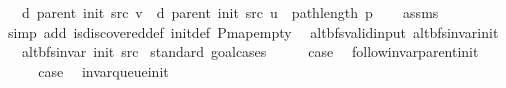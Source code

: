 \begin{isabellebody}
\ \ \ {\isachardoublequoteopen}d\ {\isacharparenleft}{\kern0pt}parent\ {\isacharparenleft}{\kern0pt}init\ src{\isacharparenright}{\kern0pt}{\isacharparenright}{\kern0pt}\ v\ {\isasymle}\ d\ {\isacharparenleft}{\kern0pt}parent\ {\isacharparenleft}{\kern0pt}init\ src{\isacharparenright}{\kern0pt}{\isacharparenright}{\kern0pt}\ u\ {\isacharplus}{\kern0pt}\ path{\isacharunderscore}{\kern0pt}length\ p{\isachardoublequoteclose}\isanewline
%
\isadelimproof
\ \ %
\endisadelimproof
%
\isatagproof
{}\isamarkupfalse%
\ assms\isanewline
\ \ \isamarkupfalse%
\ {\isacharparenleft}{\kern0pt}simp\ add{\isacharcolon}{\kern0pt}\ is{\isacharunderscore}{\kern0pt}discovered{\isacharunderscore}{\kern0pt}def\ init{\isacharunderscore}{\kern0pt}def\ P{\isachardot}{\kern0pt}map{\isacharunderscore}{\kern0pt}empty{\isacharparenright}{\kern0pt}%
\endisatagproof
{\isafoldproof}%
%
\isadelimproof
%
\endisadelimproof
%
\isadelimdocument
%
\endisadelimdocument
%
\isatagdocument
%
\isamarkupsubsubsection{%
}
\isamarkuptrue%
%
\endisatagdocument
{\isafolddocument}%
%
\isadelimdocument
%
\endisadelimdocument
{}\isamarkupfalse%
\ {\isacharparenleft}{\kern0pt}\ alt{\isacharunderscore}{\kern0pt}bfs{\isacharunderscore}{\kern0pt}valid{\isacharunderscore}{\kern0pt}input{\isacharparenright}{\kern0pt}\ alt{\isacharunderscore}{\kern0pt}bfs{\isacharunderscore}{\kern0pt}invar{\isacharunderscore}{\kern0pt}init{\isacharcolon}{\kern0pt}\isanewline
\ \ \ {\isachardoublequoteopen}alt{\isacharunderscore}{\kern0pt}bfs{\isacharunderscore}{\kern0pt}invar{\isacharprime}{\kern0pt}{\isacharprime}{\kern0pt}\ {\isacharparenleft}{\kern0pt}init\ src{\isacharparenright}{\kern0pt}{\isachardoublequoteclose}\isanewline
%
\isadelimproof
%
\endisadelimproof
%
\isatagproof
{}\isamarkupfalse%
\ {\isacharparenleft}{\kern0pt}standard{\isacharcomma}{\kern0pt}\ goal{\isacharunderscore}{\kern0pt}cases{\isacharparenright}{\kern0pt}\isanewline
{}\isamarkupfalse%
\ {}\isanewline
\ \ \isamarkupfalse%
\ {\isacharquery}{\kern0pt}case\ \isamarkupfalse%
\ follow{\isacharunderscore}{\kern0pt}invar{\isacharunderscore}{\kern0pt}parent{\isacharunderscore}{\kern0pt}init\ \isacommand{{\isachardot}{\kern0pt}}\isamarkupfalse%
\isanewline
{}\isamarkupfalse%
\isanewline
\ \ \isamarkupfalse%
\ {}\isanewline
\ \ \isamarkupfalse%
\ {\isacharquery}{\kern0pt}case\ \isamarkupfalse%
\ invar{\isacharunderscore}{\kern0pt}queue{\isacharunderscore}{\kern0pt}init\ \isacommand{{\isachardot}{\kern0pt}}\isamarkupfalse%

\end{isabellebody}
